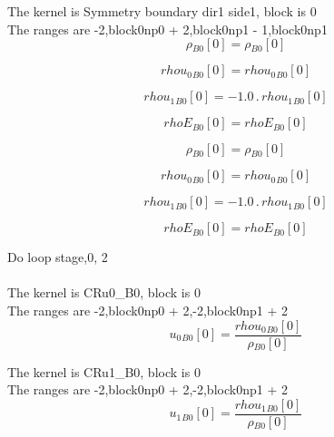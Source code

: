 \documentclass{article}
\begin{document}
\noindent The kernel is Symmetry boundary dir1 side1, block is 0\\\noindent The ranges are -2,block0np0 + 2,block0np1 - 1,block0np1\\\begin{dmath}{\rho{_{B0}}}[{0}] = {\rho{_{B0}}}[{0}]\end{dmath}

\begin{dmath}{rhou_{0}{_{B0}}}[{0}] = {rhou_{0}{_{B0}}}[{0}]\end{dmath}

\begin{dmath}{rhou_{1}{_{B0}}}[{0}] = - 1.0 \,.\, {rhou_{1}{_{B0}}}[{0}]\end{dmath}

\begin{dmath}{rhoE{_{B0}}}[{0}] = {rhoE{_{B0}}}[{0}]\end{dmath}

\begin{dmath}{\rho{_{B0}}}[{0}] = {\rho{_{B0}}}[{0}]\end{dmath}

\begin{dmath}{rhou_{0}{_{B0}}}[{0}] = {rhou_{0}{_{B0}}}[{0}]\end{dmath}

\begin{dmath}{rhou_{1}{_{B0}}}[{0}] = - 1.0 \,.\, {rhou_{1}{_{B0}}}[{0}]\end{dmath}

\begin{dmath}{rhoE{_{B0}}}[{0}] = {rhoE{_{B0}}}[{0}]\end{dmath}

\noindent Do loop stage,0, 2\\
\\\noindent The kernel is CRu0_B0, block is 0\\\noindent The ranges are -2,block0np0 + 2,-2,block0np1 + 2\\\begin{dmath}{u_{0}{_{B0}}}[{0}] = \frac{{rhou_{0}{_{B0}}}[{0}]}{{\rho{_{B0}}}[{0}]}\end{dmath}

\noindent The kernel is CRu1_B0, block is 0\\\noindent The ranges are -2,block0np0 + 2,-2,block0np1 + 2\\\begin{dmath}{u_{1}{_{B0}}}[{0}] = \frac{{rhou_{1}{_{B0}}}[{0}]}{{\rho{_{B0}}}[{0}]}\end{dmath}
\end{document}
